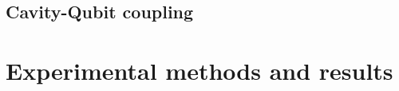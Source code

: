 \documentclass[12 pt]{book}
\begin{document}


\section{Cavity-Qubit coupling}


\chapter{Experimental methods and results}\label{chap:Experimental}

\newpage



\end{document}
